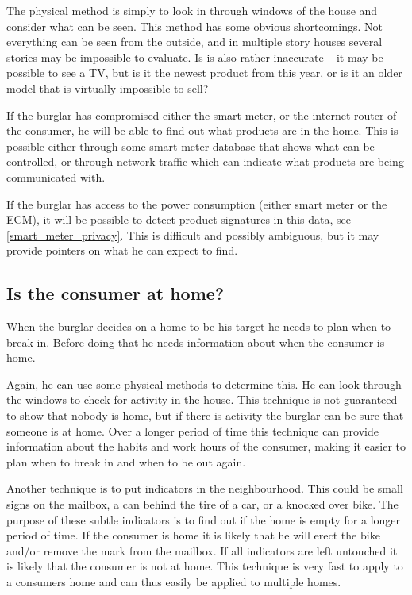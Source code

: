 The physical method is simply to look in through windows of the house and consider what can be seen. 
This method has some obvious shortcomings.
Not everything can be seen from the outside, and in multiple story houses several stories may be impossible to evaluate.
Is is also rather inaccurate -- it may be possible to see a TV, but is it the newest product from this year, or is it an older model that is virtually impossible to sell?

If the burglar has compromised either the smart meter, or the internet router of the consumer, he will be able to find out what products are in the home. 
This is possible either through some smart meter database that shows what can be controlled, or through network traffic which can indicate what products are being communicated with.

If the burglar has access to the power consumption (either smart meter or the ECM), it will be possible to detect product signatures in this data, see \cref{smart_meter_privacy}.
This is difficult and possibly ambiguous, but it may provide pointers on what he can expect to find.

\subsection{Is the consumer at home?}
When the burglar decides on a home to be his target he needs to plan when to break in.
Before doing that he needs information about when the consumer is home.

Again, he can use some physical methods to determine this.
He can look through the windows to check for activity in the house.
This technique is not guaranteed to show that nobody is home, but if there is activity the burglar can be sure that someone is at home.
Over a longer period of time this technique can provide information about the habits and work hours of the consumer, making it easier to plan when to break in and when to be out again.

Another technique is to put indicators in the neighbourhood.
This could be small signs on the mailbox, a can behind the tire of a car, or a knocked over bike.
The purpose of these subtle indicators is to find out if the home is empty for a longer period of time.
If the consumer is home it is likely that he will erect the bike and/or remove the mark from the mailbox.
If all indicators are left untouched it is likely that the consumer is not at home.
This technique is very fast to apply to a consumers home and can thus easily be applied to multiple homes.

